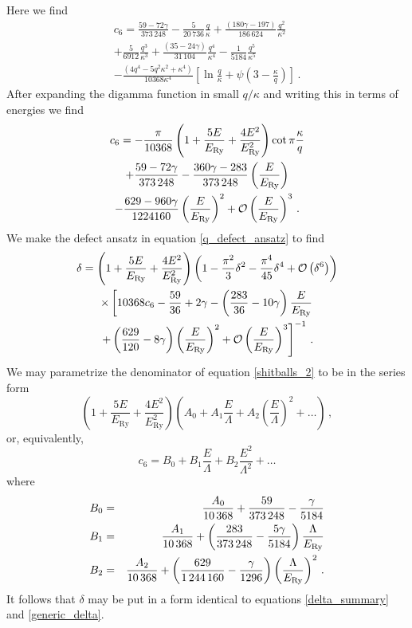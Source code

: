 \documentclass[pra,twocolumn,nofootinbib, superscriptaddress]{revtex4}%
\def\({\left(}
\def\){\right)}
\def\[{\left[}
\def\]{\right]}
\def\f#1#2{\frac{#1}{#2}}
\def\g{\gamma}
\def\de{\delta}
\def\k{\kappa}
\def\L{\Lambda}
\def\p{\pi}
\begin{document}
Here we find
\begin{multline}
c_6=\f{59-72\g}{373\,248} -\f{5}{20\,736}\f{q}{\k}  + \f{\(180\g-197\)}{186\,624}\f{q^2}{\k^2}\\
 + \f{5}{6912}\f{q^3}{\k^3}   + \f{\(35-24\g\)}{31\,104}\f{q^4}{\k^4}  - \f{1}{5184}\f{q^5}{\k^5}\\
-\f{\(4q^4-5q^2\k^2+\k^4\)}{10368\k^4}\[\ln{\f{q}{\k}}+\psi\(3-\f{\k}{q}\)\]\,.
\end{multline}
After expanding the digamma function in small $q/\k$ and writing this in terms of energies we find
\begin{multline}
c_6= -\f{\p}{10368}\(1+\f{5E}{E_\text{Ry}}+\f{4E^2}{E_\text{Ry}^2}\)\cot{\p\f{\k}{q}}\\
 + \f{59-72\g}{373\,248} - \f{360\g-283}{373\,248} \(\f{E}{E_\text{Ry}}\)\\
  -\f{629-960\g}{1224160}\(\f{E}{E_\text{Ry}}\)^2  +{\cal O}\(\f{E}{E_\text{Ry}}\)^3\,.
\end{multline}
We make the defect ansatz in equation \eqref{q_defect_ansatz} to find
\begin{multline}\label{shitballs_2}
\de =\(1+\f{5E}{E_\text{Ry}}+\f{4E^2}{E_\text{Ry}^2}\)\(1-\f{\p^2}{3}\de^2 -\f{\p^4}{45}\de^4  + {\cal O}\(\de^6\)\)\\
\times\[
10368c_6 - \f{59}{36} + 2\g - \(\f{283}{36}-10\g\)\f{E}{E_\text{Ry}}\right.\\
\left. + \(\f{629}{120} -8\g\)\(\f{E}{E_\text{Ry}}\)^2 + {\cal O}\(\f{E}{E_\text{Ry}}\)^3  \]^{-1} \,.
\end{multline}
We may parametrize the denominator of equation \eqref{shitballs_2} to be in the series form
\begin{equation}
\(1+\f{5E}{E_\text{Ry}}+\f{4E^2}{E_\text{Ry}^2}\)\(A_0 + A_1 \f{E}{\L} + A_2 \(\f{E}{\L}\)^2 +\dots\)\,,
\end{equation}
or, equivalently,
\begin{equation}
c_6 =B_0 + B_1\f{E}{\L}+ B_2\f{E^2}{\L^2} +\dots
\end{equation}
where
\begin{eqnarray}
B_0&=&\f{A_0}{10\,368} + \f{59}{373\,248}-\f{\gamma}{5184}\notag\\
B_1&=&\f{A_1}{10\,368} + \(\f{283}{373\,248} - \f{5\g}{5184}\) \f{\L}{E_\text{Ry}}  \notag\\
B_2&=&\f{A_2}{10\,368} + \(\f{629}{1\,244\,160} - \f{\g}{1296}\) \(\f{\L}{E_\text{Ry}}\)^2\,.
\end{eqnarray}
It follows that $\de$ may be put in a form identical to equations \eqref{delta_summary} and \eqref{generic_delta}.








%

\end{document}
